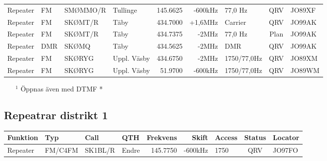 \begin{landscape}
\begin{longtable}{llllrrlcl}
	Repeater           & FM           & SMØMMO/R      & Tullinge     &          145.6625 &        -600kHz & 77,0 Hz         &       QRV       & JO89XF           \\
	Repeater           & FM           & SKØMT/R       & Täby         &          434.7000 &        +1,6MHz & Carrier         &       QRV       & JO99AK           \\
	Repeater           & FM           & SKØMT/R       & Täby         &          434.7375 &          -2MHz & 77,0 Hz         &      Plan       & JO99AK           \\
	Repeater           & DMR          & SKØMQ         & Täby         &          434.5625 &          -2MHz & DMR             &       QRV       & JO99AK           \\
	Repeater           & FM           & SKØRYG        & Uppl. Väsby  &          434.6750 &          -2MHz & 1750/77,0Hz     &       QRV       & JO89XM           \\
	Repeater           & FM           & SKØRYG        & Uppl. Väsby  &           51.9700 &        -600kHz & 1750/77,0Hz     &       QRV       & JO89WM
\end{longtable}
\begin{itemize}
	\item[$^1$] Öppnas även med DTMF *
\end{itemize}
\normalsize

\clearpage

\subsection{Repeatrar distrikt 1}
\footnotesize
\begin{longtable}{llllrrlcl}
\textbf{Funktion} & \textbf{Typ} & \textbf{Call} & \textbf{QTH} & \textbf{Frekvens} & \textbf{Skift} & \textbf{Access} & \textbf{Status} & \textbf{Locator} \\ \hline
\endhead
Repeater&	FM/C4FM&	SK1BL/R	&Endre	&145.7750	&-600kHz	&1750	&QRV	&JO97FO\\
\end{longtable}
\normalsize


\end{landscape}
